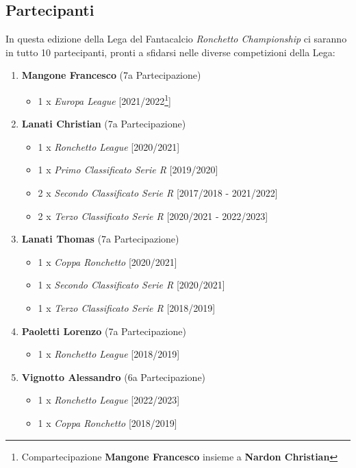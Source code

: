 \documentclass[12pt]{article}
\begin{document}
\subsection{Partecipanti}
In questa edizione della Lega del Fantacalcio \textit{Ronchetto Championship} ci saranno in tutto 10 partecipanti, pronti a sfidarsi nelle diverse competizioni della Lega:
\begin{enumerate}
    \item \textbf{Mangone Francesco} (7a Partecipazione)
    \begin{itemize}
        \item 1 x \textit{Europa League} [2021/2022\footnote{Compartecipazione \textbf{Mangone Francesco} insieme a \textbf{Nardon Christian}}]
    \end{itemize}
    \item \textbf{Lanati Christian} (7a Partecipazione)
    \begin{itemize}
        \item 1 x \textit{Ronchetto League} [2020/2021]
        \item 1 x \textit{Primo Classificato Serie R} [2019/2020]
        \item 2 x \textit{Secondo Classificato Serie R} [2017/2018 - 2021/2022]
        \item 2 x \textit{Terzo Classificato Serie R} [2020/2021 - 2022/2023]
    \end{itemize}
    \item \textbf{Lanati Thomas} (7a Partecipazione)
    \begin{itemize}
        \item 1 x \textit{Coppa Ronchetto} [2020/2021]
        \item 1 x \textit{Secondo Classificato Serie R} [2020/2021]
        \item 1 x \textit{Terzo Classificato Serie R} [2018/2019]
    \end{itemize}
    \item \textbf{Paoletti Lorenzo} (7a Partecipazione)
    \begin{itemize}
        \item 1 x \textit{Ronchetto League} [2018/2019]
    \end{itemize}
    \item \textbf{Vignotto Alessandro} (6a Partecipazione)
    \begin{itemize}
        \item 1 x \textit{Ronchetto League} [2022/2023]
        \item 1 x \textit{Coppa Ronchetto} [2018/2019]

\end{itemize}
\end{enumerate}
\end{document}
